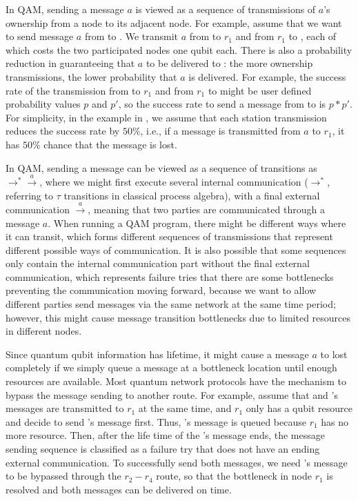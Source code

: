 In QAM, sending a message $a$ is viewed as a sequence of transmissions of $a$'s ownership from a node to its adjacent node.
For example, assume that we want to send message $a$ from  to .
We transmit $a$ from  to $r_1$ and from $r_1$ to , 
each of which costs the two participated nodes one qubit each.
There is also a probability reduction in guaranteeing that $a$ to be delivered to :
the more ownership transmissions, the lower probability that $a$ is delivered.
For example, the success rate of the transmission from  to $r_1$ and from $r_1$ to  might be user defined probability values $p$ and $p'$, so the success rate to send a message from  to  is $p * p'$.
For simplicity, in the example in , we assume that each station transmission reduces the success rate by $50\%$,
i.e., if a message is transmitted from $a$ to $r_1$, it has $50\%$ chance that the message is lost.

In QAM, sending a message can be viewed as a sequence of transitions as $\to^{*}\xrightarrow{a}$,
where we might first execute several internal communication ($\to^{*}$, referring to $\tau$ transitions in classical process algebra),
with a final external communication $\xrightarrow{a}$, meaning that two parties are communicated through a message $a$.
When running a QAM program, there might be different ways where it can transit, which forms different sequences of transmissions that represent different possible ways of communication. It is also possible that some sequences only contain the internal communication part without the final external communication, which represents failure tries that there are some bottlenecks preventing the communication moving forward, because we want to allow different parties send messages via the same network at the same time period; however, this might cause message transition bottlenecks due to limited resources in different nodes.

Since quantum qubit information has lifetime, it might cause a message $a$ to lost completely if we simply queue a message at a bottleneck location until enough resources are available. Most quantum network protocols have the mechanism to bypass the message sending to another route. For example, assume that  and 's messages are transmitted to $r_1$ at the same time, and $r_1$ only has a qubit resource and decide to send 's message first. Thus, 's message is queued because $r_1$ has no more resource. Then, after the life time of the 's message ends, the message sending sequence is classified as a failure try that does not have an ending external communication. To successfully send both messages, we need 's message to be bypassed through the $r_2 - r_4$ route, so that the bottleneck in node $r_1$ is resolved and both messages can be delivered on time.

